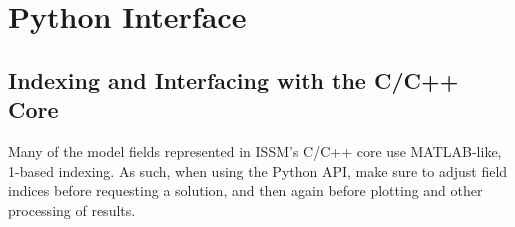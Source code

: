 
\section{Python Interface} \label{sec:troubleshooting-interfaces-python}
\subsection*{Indexing and Interfacing with the C/C++ Core}%
Many of the model fields represented in ISSM's C/C++ core use MATLAB-like, 1-based indexing. As such, when using the Python API, make sure to adjust field indices before requesting a solution, and then again before plotting and other processing of results.

\clearpage %
